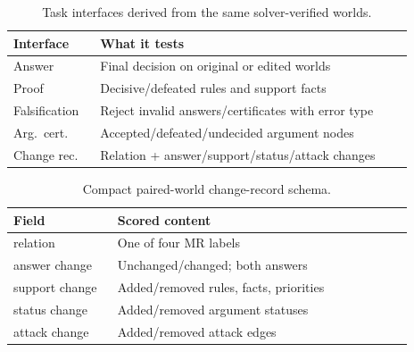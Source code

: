 \documentclass[letterpaper]{article}
\begin{document}
\begin{table}[t]
\centering
\setlength{\tabcolsep}{3pt}
\small
\begin{tabular}{@{}p{0.20\linewidth}p{0.72\linewidth}@{}}
\toprule
Interface & What it tests \\
\midrule
Answer & Final decision on original or edited worlds \\
Proof & Decisive/defeated rules and support facts \\
Falsification & Reject invalid answers/certificates with error type \\
Arg.\ cert. & Accepted/defeated/undecided argument nodes \\
Change rec. & Relation + answer/support/status/attack changes \\
\bottomrule
\end{tabular}
\caption{Task interfaces derived from the same solver-verified worlds.}
\label{tab:tasks}
\end{table}

\begin{table}[t]
\centering
\setlength{\tabcolsep}{2pt}
\small
\begin{tabular}{@{}>{\raggedright\arraybackslash}p{0.24\linewidth}>{\raggedright\arraybackslash}p{0.68\linewidth}@{}}
\toprule
Field & Scored content \\
\midrule
relation & One of four MR labels \\
answer change & Unchanged/changed; both answers \\
support change & Added/removed rules, facts, priorities \\
status change & Added/removed argument statuses \\
attack change & Added/removed attack edges \\
\bottomrule
\end{tabular}
\caption{Compact paired-world change-record schema.}
\label{tab:schema}
\end{table}
\end{document}

